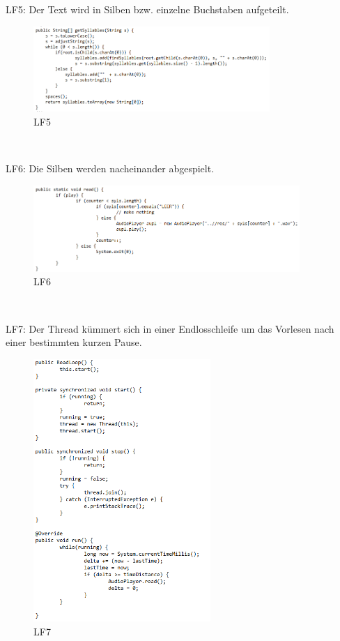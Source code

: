 \documentclass[12pt]{scrartcl}
\begin{document}
\newpage

LF5: Der Text wird in Silben bzw. einzelne Buchstaben aufgeteilt.
\begin{figure}[hp!]
 \centering
 \includegraphics[width=0.8\textwidth]{res/LF5}
 \caption{LF5}
 \label{fig: fig5}
\end{figure}
~

\newpage

LF6: Die Silben werden nacheinander abgespielt.
\begin{figure}[hp!]
 \centering
 \includegraphics[width=0.9\textwidth]{res/LF6}
 \caption{LF6}
 \label{fig: fig6}
\end{figure}
~
	
\newpage
	
LF7: Der Thread kümmert sich in einer Endlosschleife um das Vorlesen nach einer bestimmten kurzen Pause.
\begin{figure}[hp!]
 \centering
 \includegraphics[width=0.6\textwidth]{res/LF7}
 \caption{LF7}
 \label{fig: fig7}
\end{figure}
~
\end{document}
